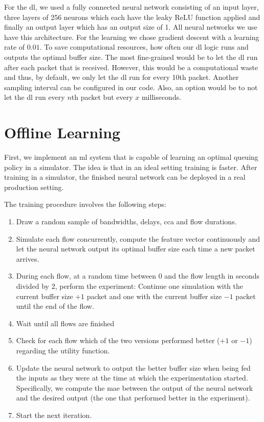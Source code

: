 \documentclass[conference]{IEEEtran}
\begin{document}
For the \gls{dl}, we used a fully connected neural network consisting of an input layer, three layers of 256 neurons which each have the leaky ReLU \cite{noauthor_rectifier_2020} function applied and finally an output layer which has an output size of 1. All neural networks we use have this architecture. For the learning we chose gradient descent with a learning rate of $0.01$. To save computational resources, how often our \gls{dl} logic runs and outputs the optimal buffer size. The most fine-grained would be to let the \gls{dl} run after each packet that is received. However, this would be a computational waste and thus, by default, we only let the \gls{dl} run for every 10th packet. Another sampling interval can be configured in our code. Also, an option would be to not let the \gls{dl} run every $n$th packet but every $x$ milliseconds. 

\section{Offline Learning}

First, we implement an \gls{ml} system that is capable of learning an optimal queuing policy in a simulator. The idea is that in an ideal setting training is faster. After training in a simulator, the finished neural network can be deployed in a real production setting. 

The training procedure involves the following steps:
\begin{enumerate}
\item Draw a random sample of bandwidths, delays, \gls{cca} and flow durations.
\item Simulate each flow concurrently, compute the feature vector continuously and let the neural network output its optimal buffer size each time a new packet arrives. 
\item During each flow, at a random time between 0 and the flow length in seconds divided by 2, perform the experiment: Continue one simulation with the current buffer size $+1$ packet and one with the current buffer size $-1$ packet until the end of the flow. 
\item Wait until all flows are finished
\item Check for each flow which of the two versions performed better ($+1$ or $-1$) regarding the utility function.
\item Update the neural network to output the better buffer size when being fed the inputs as they were at the time at which the experimentation started. Specifically, we compute the \gls{mae} between the output of the neural network and the desired output (the one that performed better in the experiment).
\item Start the next iteration. 
\end{enumerate}
\end{document}
